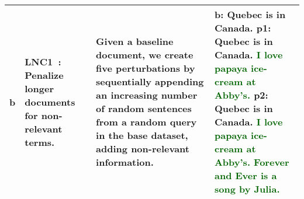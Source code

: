 \begin{table*}[h!]
\begin{tabular}{p{1.6cm} p{3.8cm} p{5.2cm} p{5.8cm}}
    \midrule
    \textbf{b} 
    & \textbf{LNC1~\cite{fang2004formal}}: Penalize longer documents for non-relevant terms. 
    & Given a baseline document, we create five perturbations by sequentially appending an increasing number of random sentences from a random query in the base dataset, adding non-relevant information.
    & \textbf{b:} Quebec is in Canada. \newline 
      \textbf{p1:} Quebec is in Canada. \textcolor{darkgreen}{I love papaya ice-cream at Abby's.} \newline 
      \textbf{p2:} Quebec is in Canada. \textcolor{darkgreen}{I love papaya ice-cream at Abby's. Forever and Ever is a song by Julia.} \\
    \bottomrule

  \end{tabular}

  


\end{table*}



